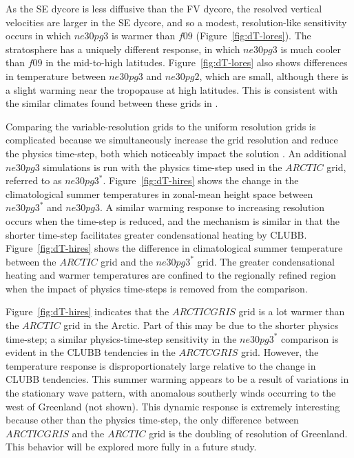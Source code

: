 \documentclass[draft]{agujournal2019}
\begin{document}
As the SE dycore is less diffusive than the FV dycore, the resolved vertical velocities are larger in the SE dycore, and so a modest, resolution-like sensitivity occurs in which $ne30pg3$ is warmer than $f09$ (Figure~\ref{fig:dT-lores}). The stratosphere has a uniquely different response, in which $ne30pg3$ is much cooler than $f09$ in the mid-to-high latitudes. Figure~\ref{fig:dT-lores} also shows differences in temperature between $ne30pg3$ and $ne30pg2$, which are small, although there is a slight warming near the tropopause at high latitudes. This is consistent with the similar climates found between these grids in .

Comparing the variable-resolution grids to the uniform resolution grids is complicated because we simultaneously increase the grid resolution and reduce the physics time-step, both which noticeably impact the solution \cite{W2008TELLUS}. An additional $ne30pg3$ simulations is run with the physics time-step used in the $ARCTIC$ grid, referred to as $ne30pg3^{*}$. Figure~\ref{fig:dT-hires} shows the change in the climatological summer temperatures in zonal-mean height space between $ne30pg3^{*}$ and $ne30pg3$. A similar warming response to increasing resolution occurs when the time-step is reduced, and the mechanism is similar in that the shorter time-step facilitates greater condensational heating by CLUBB. Figure~\ref{fig:dT-hires} shows the difference in climatological summer temperature between the $ARCTIC$ grid and the $ne30pg3^{*}$ grid. The greater condensational heating and warmer temperatures are confined to the regionally refined region when the impact of physics time-steps is removed from the comparison.

Figure~\ref{fig:dT-hires} indicates that the $ARCTICGRIS$ grid is a lot warmer than the $ARCTIC$ grid in the Arctic. Part of this may be due to the shorter physics time-step; a similar physics-time-step sensitivity in the $ne30pg3^{*}$ comparison is evident in the CLUBB tendencies in the $ARCTCGRIS$ grid. However, the temperature response is disproportionately large relative to the change in CLUBB tendencies. This summer warming appears to be a result of variations in the stationary wave pattern, with anomalous southerly winds occurring to the west of Greenland (not shown). This dynamic response is extremely interesting because other than the physics time-step, the only difference between $ARCTICGRIS$ and the $ARCTIC$ grid is the doubling of resolution of Greenland. This behavior will be explored more fully in a future study.
\end{document}
